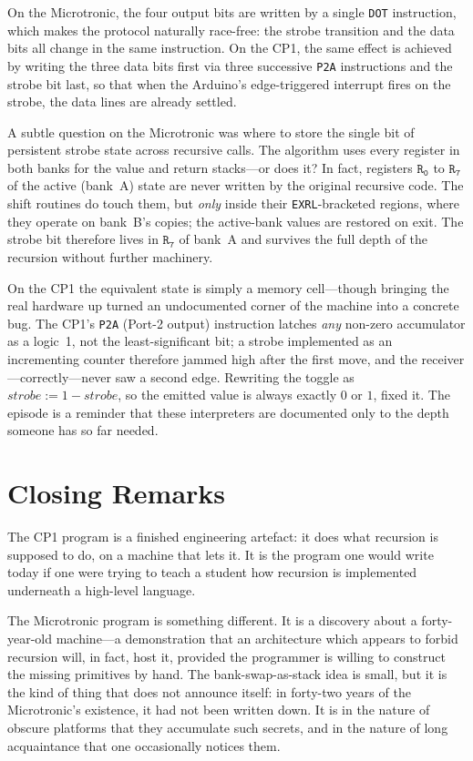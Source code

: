 \documentclass[11pt,a4paper]{article}
\begin{document}
\noindent
On the Microtronic, the four output bits are written by a single
\texttt{DOT} instruction, which makes the protocol naturally
race-free: the strobe transition and the data bits all change in the
same instruction. On the CP1, the same effect is achieved by writing
the three data bits first via three successive \texttt{P2A}
instructions and the strobe bit last, so that when the Arduino's
edge-triggered interrupt fires on the strobe, the data lines are
already settled.

A subtle question on the Microtronic was where to store the
single bit of persistent strobe state across recursive calls. The
algorithm uses every register in both banks for the value and return
stacks---or does it? In fact, registers $\mathtt{R_0}$ to
$\mathtt{R_7}$ of the active (bank~A) state are never written by the
original recursive code. The shift routines do touch them, but
\emph{only} inside their \texttt{EXRL}-bracketed regions, where they
operate on bank~B's copies; the active-bank values are restored on
exit. The strobe bit therefore lives in $\mathtt{R_7}$ of bank~A and
survives the full depth of the recursion without further machinery.

On the CP1 the equivalent state is simply a memory cell---though
bringing the real hardware up turned an undocumented corner of the
machine into a concrete bug. The CP1's \texttt{P2A} (Port-2 output)
instruction latches \emph{any} non-zero accumulator as a logic~1, not
the least-significant bit; a strobe implemented as an incrementing
counter therefore jammed high after the first move, and the
receiver---correctly---never saw a second edge. Rewriting the toggle as
\(\mathit{strobe} := 1 - \mathit{strobe}\), so the emitted value is
always exactly $0$ or $1$, fixed it. The episode is a reminder that
these interpreters are documented only to the depth someone has so far
needed.

\section{Closing Remarks}

The CP1 program is a finished engineering artefact: it does what
recursion is supposed to do, on a machine that lets it. It is the
program one would write today if one were trying to teach a student
how recursion is implemented underneath a high-level language.

The Microtronic program is something different. It is a discovery
about a forty-year-old machine---a demonstration that an architecture
which appears to forbid recursion will, in fact, host it, provided
the programmer is willing to construct the missing primitives by
hand. The bank-swap-as-stack idea is small, but it is the kind of
thing that does not announce itself: in forty-two years of the
Microtronic's existence, it had not been written down. It is in the
nature of obscure platforms that they accumulate such secrets, and in
the nature of long acquaintance that one occasionally notices them.
\end{document}
